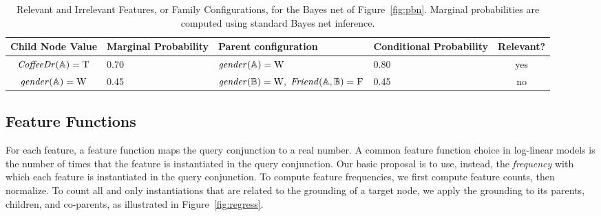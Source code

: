 \documentclass[runningheads,a4paper]{llncs}
\begin{document}
\begin{table}
\caption{Relevant and Irrelevant Features, or Family Configurations, for the Bayes net of Figure~\ref{fig:pbn}. Marginal probabilities are computed using standard Bayes net inference.}
\begin{center}
 \begin{tabular}{@{} |c p{2cm}|p{3.5cm} p{2cm}|c|@{}}
 \hline
Child Node Value & Marginal Probability & Parent configuration & Conditional Probability & Relevant? \\\hline
$\it{CoffeeDr}(\mathbb{A}) = \mathrm{T}$ & 0.70 & $\it{gender}(\mathbb{A}) = \mathrm{W}$ & 0.80 & yes \\
$\it{gender}(\mathbb{A}) = \mathrm{W}$ & 0.45 & $\it{gender}(\mathbb{B}) = \mathrm{W},$ $\it{Friend}(\mathbb{A},\mathbb{B}) = \mathrm{F}$ & 0.45 & no \\\hline
\end{tabular}
\end{center}
\label{table:relevance}
\end{table}%



\subsection{Feature Functions} \label{sec:predictors}
For each feature, a feature function maps the query conjunction to a real number. A common feature function choice in log-linear models is the number of times that the feature is instantiated in the query conjunction. 
Our basic proposal is to use, instead, the {\em frequency} with which each feature
is instantiated in the query conjunction. 
%
To compute feature frequencies, we first compute feature counts, then normalize.
To count all and only instantiations that are related to the grounding of a target node, we apply the grounding to its parents, children, and co-parents, as illustrated in Figure~\ref{fig:regress}. 
\end{document}
